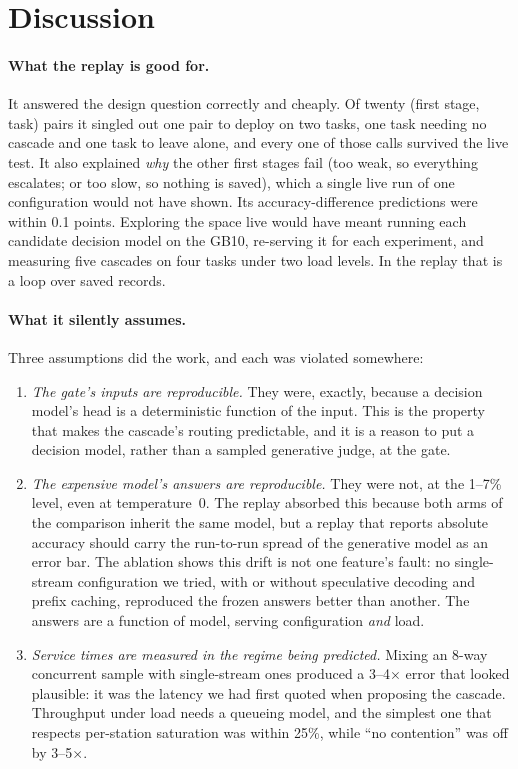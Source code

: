 \documentclass[11pt]{article}
\begin{document}
\section{Discussion}

\paragraph{What the replay is good for.} It answered the design question correctly and cheaply. Of
twenty (first stage, task) pairs it singled out one pair to deploy on two tasks, one task needing no
cascade and one task to leave alone, and every one of those calls survived the live test. It also
explained \emph{why} the other first stages fail (too weak, so everything escalates; or too slow, so
nothing is saved), which a single live run of one configuration would not have shown. Its
accuracy-difference predictions were within 0.1 points. Exploring the space live would have meant
running each candidate decision model on the GB10, re-serving it for each experiment, and measuring
five cascades on four tasks under two load levels. In the replay that is a loop over saved records.

\paragraph{What it silently assumes.} Three assumptions did the work, and each was violated
somewhere:
\begin{enumerate}
  \item \emph{The gate's inputs are reproducible.} They were, exactly, because a decision model's head
        is a deterministic function of the input. This is the property that makes the cascade's
        routing predictable, and it is a reason to put a decision model, rather than a sampled
        generative judge, at the gate.
  \item \emph{The expensive model's answers are reproducible.} They were not, at the 1--7\% level, even
        at temperature~0. The replay absorbed this because both arms of the comparison inherit the same
        model, but a replay that reports absolute accuracy should carry the run-to-run spread of the
        generative model as an error bar. The ablation shows this drift is not one feature's fault: no
single-stream configuration we tried, with or without speculative decoding and prefix caching,
reproduced the frozen answers better than another. The answers are a function of model, serving
configuration \emph{and} load.
  \item \emph{Service times are measured in the regime being predicted.} Mixing an 8-way concurrent
        sample with single-stream ones produced a 3--4$\times$ error that looked plausible: it was
        the latency we had first quoted when proposing the cascade. Throughput under load needs a
        queueing model, and the simplest one that respects per-station saturation was within 25\%,
        while ``no contention'' was off by 3--5$\times$.
\end{enumerate}
\end{document}
